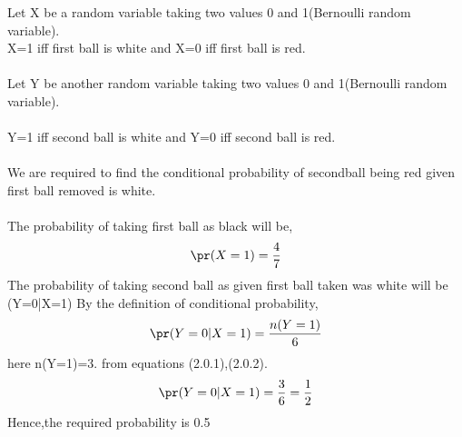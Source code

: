 Let X be a random variable taking two values 0 and 1(Bernoulli random variable).
\\X=1 iff first ball is white and X=0 iff first ball is red.\\
\\Let Y be another random variable taking two values 0 and 1(Bernoulli random variable). \\
\\Y=1 iff second ball is white and Y=0 iff second ball is red.\\
\\We are required to find the conditional probability of secondball being red given first ball removed is white.\\
\\The probability of taking first ball as black will be,
\begin{align}
\pr(X=1)=\frac{4}{7}
\end{align}
The probability of taking second ball as given first ball taken was white will be %
\pr(Y=0|X=1) %
By the definition of conditional probability,
\begin{align}
\pr(Y=0| X=1)=\frac{n(Y=1)}{6}
\end{align}
here n(Y=1)=3.
from equations (2.0.1),(2.0.2).
\begin{align}
\pr(Y=0|X=1)=\frac{3}{6}=\frac{1}{2}
\end{align}
Hence,the required probability is 0.5